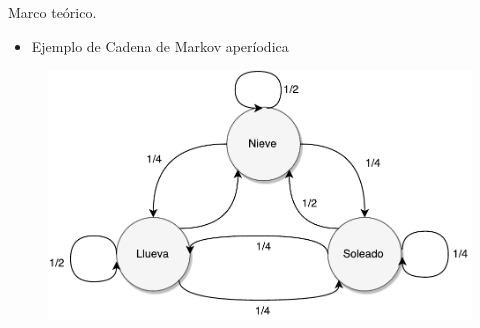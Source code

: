 \begin{frame}{Marco teórico}{\textcolor{UniBlue}{.}}
\begin{itemize}
	\item Ejemplo de Cadena de Markov aperíodica
\end{itemize}

\begin{figure}[p]
	\centering
	\includegraphics[scale=0.5]{images/EjCadenaMarkov-Aperiodica.pdf}
\end{figure}

\end{frame}